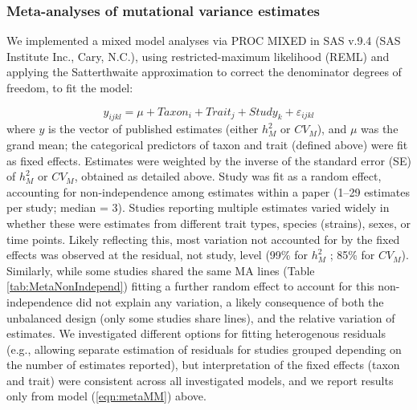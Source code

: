 \subsubsection{Meta-analyses of mutational variance estimates}
We implemented a mixed model analyses via PROC MIXED in SAS v.9.4 (SAS Institute Inc., Cary, N.C.), using restricted-maximum likelihood (REML) and applying the Satterthwaite approximation to correct the denominator degrees of freedom, to fit the model: \par
\begin{equation}
\label{eqn:metaMM}
y_{ijkl}=\mu + Taxon_i + Trait_j + Study_k + \varepsilon_{ijkl}
\end{equation}
\noindent where $y$ is the vector of published estimates (either $h_M^2$ or $CV_M$), and $\mu$ was the grand mean; the categorical predictors of taxon and trait (defined above) were fit as fixed effects. Estimates were weighted by the inverse of the standard error (SE) of $h_M^2$ or $CV_M$, obtained as detailed above. Study was fit as a random effect, accounting for non-independence among estimates within a paper (1–29 estimates per study; median = 3). Studies reporting multiple estimates varied widely in whether these were estimates from different trait types, species (strains), sexes, or time points. Likely reflecting this, most variation not accounted for by the fixed effects was observed at the residual, not study, level (99\% for $h_M^2$ ; 85\% for $CV_M$). Similarly, while some studies shared the same MA lines (Table \ref{tab:MetaNonIndepend}) fitting a further random effect to account for this non-independence did not explain any variation, a likely consequence of both the unbalanced design (only some studies share lines), and the relative variation of estimates. We investigated different options for fitting heterogenous residuals (e.g., allowing separate estimation of residuals for studies grouped depending on the number of estimates reported), but interpretation of the fixed effects (taxon and trait) were consistent across all investigated models, and we report results only from model (\ref{eqn:metaMM}) above. \par

